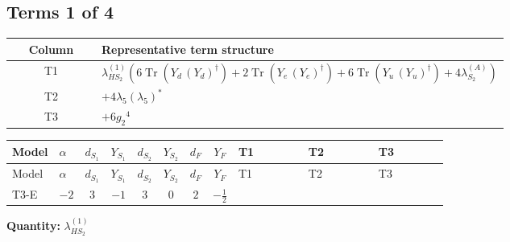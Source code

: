 \documentclass[8pt]{article}
\begin{document}
\begin{landscape}
\subsection*{Terms 1 of 4}
\begin{center}
\begin{tabular}{@{}c >{\raggedright\arraybackslash}p{0.82\linewidth}@{}}
\toprule
Column & Representative term structure \\
\midrule
T1 & \(\displaystyle {\lambda_{HS_2}^{(1)}} (6 \operatorname{Tr}\!\left({Y_d}\,\left({Y_d}\right)^{\dagger}\right)+2 \operatorname{Tr}\!\left({Y_e}\,\left({Y_e}\right)^{\dagger}\right)+6 \operatorname{Tr}\!\left({Y_u}\,\left({Y_u}\right)^{\dagger}\right)+4 {\lambda_{S_2}^{(A)}})\) \\
\midrule
T2 & \(\displaystyle +4 {\lambda_5} \left({\lambda_5}\right)^{*}\) \\
\midrule
T3 & \(\displaystyle +6 {g_2}^4\) \\
\midrule
\bottomrule
\end{tabular}
\end{center}
\smallskip
\tiny
\begin{longtable}{@{}llcccccc >{\raggedright\arraybackslash}p{0.21\linewidth} >{\raggedright\arraybackslash}p{0.21\linewidth} >{\raggedright\arraybackslash}p{0.21\linewidth}@{}}
\toprule
Model & $\alpha$ & $d_{S_1}$ & $Y_{S_1}$ & $d_{S_2}$ & $Y_{S_2}$ & $d_F$ & $Y_F$ & T1 & T2 & T3 \\
\midrule
\endfirsthead
\toprule
Model & $\alpha$ & $d_{S_1}$ & $Y_{S_1}$ & $d_{S_2}$ & $Y_{S_2}$ & $d_F$ & $Y_F$ & T1 & T2 & T3 \\
\midrule
\endhead
T3-E & $-2$ & $3$ & $-1$ & $3$ & $0$ & $2$ & $-\frac{1}{2}$ & \scriptsize\adjustbox{max width=\linewidth}{$\begin{gathered} {\lambda_{HS_2}^{(1)}} (6 \operatorname{Tr}\!\left({Y_d}\,\left({Y_d}\right)^{\dagger}\right)+2 \operatorname{Tr}\!\left({Y_e}\,\left({Y_e}\right)^{\dagger}\right)+6 \operatorname{Tr}\!\left({Y_u}\,\left({Y_u}\right)^{\dagger}\right)+4 {\lambda_{S_2}^{(A)}})\end{gathered}$} & \scriptsize\adjustbox{max width=\linewidth}{$\begin{gathered} +4 {\lambda_5} \left({\lambda_5}\right)^{*}\end{gathered}$} & \scriptsize\adjustbox{max width=\linewidth}{$\begin{gathered} +6 {g_2}^4\end{gathered}$} \\
\midrule
\bottomrule
\end{longtable}
\clearpage
\noindent\textbf{Quantity: }$\lambda_{HS_2}^{(1)}$\par\smallskip

\end{landscape}
\end{document}
